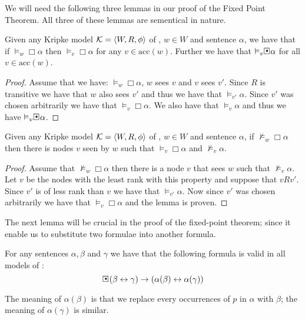 \documentclass[../main.tex]{subfiles}
\begin{document}
We will need the following three lemmas in our proof of the Fixed Point
Theorem.
All three of these lemmas are sementical in nature. 
\begin{lem}
	\label{lem:acc}
	Given any Kripke model $\mathcal{K}=\langle W,R,\phi\rangle$ of \GL, $w\in W$ and
	sentence $\alpha$, we have that if $\vDash_w\Box\alpha$ then
	$\vDash_v\Box\alpha$ for any $v\in\text{acc}(w)$. Further we have that
	$\vDash_v\sBox\alpha$ for all $v\in\text{acc}(w)$.
\end{lem}
\begin{proof}
	Assume that we have: $\vDash_w\Box\alpha$, $w$ sees  $v$ and
	$v$ sees $v'$. Since $R$ is transitive we have that $w$ also sees $v'$ and thus we have that $\vDash_{v'}\alpha$. Since
	$v'$ was chosen arbitrarily we have that $\vDash_v\Box\alpha$. We also
	have that $\vDash_v\alpha$ and thus we have $\vDash_v\sBox\alpha$.
\end{proof}
\begin{lem}
	\label{lem:con}
	Given any Kripke model $\mathcal{K}=\langle W,R,\phi\rangle$ of \GL, $w\in W$ and
	sentence $\alpha$, if $\not\vDash_w\Box\alpha$ then there is nodes
	$v$ seen by  $w$ such that $\vDash_v\Box\alpha$ and
	$\not\vDash_v\alpha$.
\end{lem}
\begin{proof}
	Assume that $\not\vDash_w\Box\alpha$ then there is a node $v$
	that sees  $w$ such that $\not\vDash_v\alpha$. Let $v$ be the nodes
	with the least rank with this property and suppose that $vRv'$. Since
	$v'$ is of less rank than $v$ we have that $\vDash_{v'}\alpha$. Now
	since $v'$ was chosen arbitrarily we have that $\vDash_v\Box\alpha$ and
	the lemma is proven.
\end{proof}
The next lemma will be crucial in the proof of the fixed-point theorem; since
it enable us to substitute two formulae into another formula.
\begin{lem}
	\label{lem:sem}
	For any sentences $\alpha,\beta$ and $\gamma$ we have that the
	following formula is valid in all models of \GL:
	$$\sBox(\beta\leftrightarrow\gamma)\rightarrow(\alpha(\beta)\leftrightarrow\alpha(\gamma))$$
\end{lem}
The meaning of $\alpha(\beta)$ is that we replace every occurrences of $p$ in
$\alpha$ with $\beta$; the meaning of $\alpha(\gamma)$ is similar.
\end{document}
